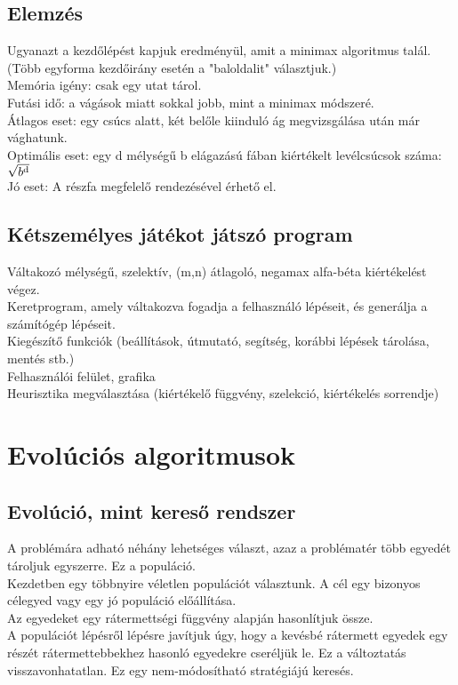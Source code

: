 \documentclass{article}
\begin{document}
	 \subsection{Elemzés}
	 Ugyanazt a kezdőlépést kapjuk eredményül, amit a minimax algoritmus talál. (Több egyforma kezdőirány esetén a "baloldalit" választjuk.)\\
	 Memória igény: csak egy utat tárol.\\
	 Futási idő: a vágások miatt sokkal jobb, mint a minimax módszeré.\\
	 Átlagos eset: egy csúcs alatt, két belőle kiinduló ág megvizsgálása után már vághatunk.\\
	 Optimális eset: egy d mélységű b elágazású fában kiértékelt levélcsúcsok száma: $\sqrt{b\textsuperscript{d}}$\\
	 Jó eset: A részfa megfelelő rendezésével érhető el.
	 
	 \subsection{Kétszemélyes játékot játszó program}
	 Váltakozó mélységű, szelektív, (m,n) átlagoló, negamax alfa-béta kiértékelést végez.\\
	 Keretprogram, amely váltakozva fogadja a felhasználó lépéseit, és generálja a számítógép lépéseit.\\
	 Kiegészítő funkciók (beállítások, útmutató, segítség, korábbi lépések tárolása, mentés stb.)\\
	 Felhasználói felület, grafika\\
	 Heurisztika megválasztása (kiértékelő függvény, szelekció, kiértékelés sorrendje)\\
	 
	 \section{Evolúciós algoritmusok}
	 
	 \subsection{Evolúció, mint kereső rendszer}
	 A problémára adható néhány lehetséges választ, azaz a problématér több egyedét tároljuk egyszerre. Ez a populáció.\\
	 Kezdetben egy többnyire véletlen populációt választunk. A cél egy bizonyos célegyed vagy egy jó populáció előállítása.\\
	 Az egyedeket egy rátermettségi függvény alapján hasonlítjuk össze.\\
	 A populációt lépésről lépésre javítjuk úgy, hogy a kevésbé rátermett egyedek egy részét rátermettebbekhez hasonló egyedekre cseréljük le. Ez a változtatás visszavonhatatlan. Ez egy nem-módosítható stratégiájú keresés.\\
	 
\end{document}
